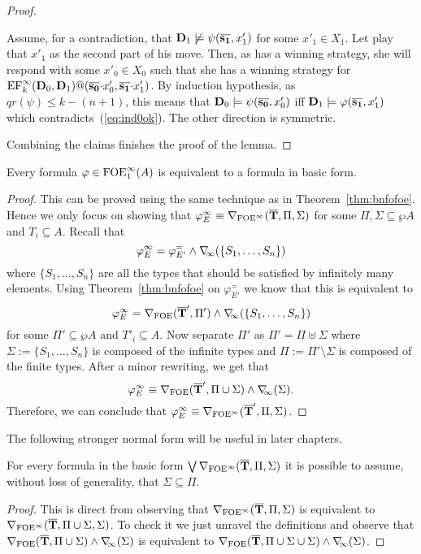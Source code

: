 \begin{proof}
\begin{pfclaim}
		Assume, for a contradiction, that $\mathbf{D}_1 \not\models \psi(\overline{{\mathbf{s_1}}},x'_1)$ for some $x'_1\in X_1$. Let \abelard play that $x'_1$ as the second part of his move. Then, as \eloise has a winning strategy, she will respond with some $x'_0 \in X_0$ such that she has a winning strategy for $\mathrm{EF}_{k}^\infty(\mathbf{D}_0,\mathbf{D}_1)@(\overline{{\mathbf{s_0}}}{\cdot}x'_0,\overline{{\mathbf{s_1}}}{\cdot}x'_1)$. By induction hypothesis, as $qr(\psi) \leq k-(n+1)$, this means that $\mathbf{D}_0 \models \psi(\overline{{\mathbf{s_0}}},x'_0)$ iff $\mathbf{D}_1 \models \varphi(\overline{{\mathbf{s_1}}},x'_1)$ which contradicts~(\ref{eq:ind0ok}). The other direction is symmetric.
	\end{pfclaim}
	Combining the claims finishes the proof of the lemma.
\end{proof}


\begin{theorem}\label{thm:bfofoei}
Every formula $\varphi \in \mathrm{FOE}^{\infty}_1(A)$ is equivalent to a formula in basic form.
\end{theorem}
\begin{proof}
	This can be proved using the same technique as in Theorem~\ref{thm:bnfofoe}. Hence we only focus on showing that $\varphi_E^\infty \equiv \nabla_{\mathrm{FOE}^{\infty}}(\overline{{\mathbf{T}}},\Pi,\Sigma)$ for some $\Pi,\Sigma \subseteq \wp A$ and $T_i \subseteq A$. Recall that
	\[
	\varphi^\infty_E = \varphi^=_{E'} \land \nabla_{\!\!\infty}(\{S_1,\dots,S_n\})
	\]
	where $\{S_1,\dots,S_n\}$ are all the types that should be satisfied by infinitely many elements.
	Using Theorem~\ref{thm:bnfofoe} on $\varphi^=_{E'}$ we know that this is equivalent to
	\[
	\varphi^\infty_E = \nabla_{\mathrm{FOE}}(\overline{{\mathbf{T}}}',\Pi') \land \nabla_{\!\!\infty}(\{S_1,\dots,S_n\})
	\]
	for some $\Pi' \subseteq \wp A$ and $T'_i \subseteq A$. Now separate $\Pi'$ as $\Pi' = \Pi \uplus \Sigma$ where $\Sigma:=\{S_1,\dots,S_n\}$ is composed of the infinite types and $\Pi := \Pi'\setminus\Sigma$ is composed of the finite types. After a minor rewriting, we get that
	\[
	\varphi^\infty_E \equiv \nabla_{\mathrm{FOE}}(\overline{{\mathbf{T}}}',\Pi\cup\Sigma) \land \nabla_{\!\!\infty}(\Sigma).
	\]
	Therefore, we can conclude that $\varphi^\infty_E \equiv \nabla_{\mathrm{FOE}^{\infty}}(\overline{{\mathbf{T}}}',\Pi,\Sigma)$.
\end{proof}

\noindent The following stronger normal form will be useful in later chapters.

\begin{proposition}\label{prop:bfofoei-sigmapi}
	For every formula in the basic form $\bigvee \nabla_{\mathrm{FOE}^{\infty}}(\overline{{\mathbf{T}}},\Pi,\Sigma)$ it is possible to assume, without loss of generality, that $\Sigma \subseteq \Pi$.
\end{proposition}
\begin{proof}
	This is direct from observing that $\nabla_{\mathrm{FOE}^{\infty}}(\overline{{\mathbf{T}}},\Pi,\Sigma)$ is equivalent to $\nabla_{\mathrm{FOE}^{\infty}}(\overline{{\mathbf{T}}},\Pi\cup\Sigma,\Sigma)$. To check it we just unravel the definitions and observe that
	$\nabla_{\mathrm{FOE}}(\overline{{\mathbf{T}}},\Pi \cup \Sigma) \land \nabla_{\!\!\infty}(\Sigma)$ is equivalent to $\nabla_{\mathrm{FOE}}(\overline{{\mathbf{T}}},\Pi \cup \Sigma \cup \Sigma) \land \nabla_{\!\!\infty}(\Sigma)$.
\end{proof}
